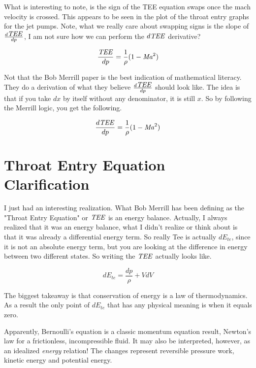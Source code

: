 \documentclass{article}
\newcommand\Mach{\mbox{\textit{Ma}}}  %
\newcommand\Tee{\mbox{\textit{TEE}}}  %
\begin{document}
What is interesting to note, is the sign of the TEE equation swaps once the mach velocity is crossed. This appears to be seen in the plot of the throat entry graphs for the jet pumps. Note, what we really care about swapping signs is the slope of $\frac{d\Tee}{dp}$, I am not sure how we can perform the $d\Tee$ derivative?

\begin{equation}
\frac{\Tee}{dp} = \frac{1}{\rho}(1 - \Mach^2)
\end{equation}

Not that the Bob Merrill paper \cite{merrill} is the best indication of mathematical literacy. They do a derivation of what they believe $\frac{d\Tee}{dp}$ should look like. The idea is that if you take $dx$ by itself without any denominator, it is still $x$. So by following the Merrill logic, you get the following.

\begin{equation}
    \frac{d\Tee}{dp} = \frac{1}{\rho}(1 - \Mach^2)
\end{equation}

\section{Throat Entry Equation Clarification}

I just had an interesting realization. What Bob Merrill has been defining as the "Throat Entry Equation" or $\Tee$ is an energy balance. Actually, I always realized that it was an energy balance, what I didn't realize or think about is that it was already a differential energy term. So really Tee is actually $dE_{te}$, since it is not an absolute energy term, but you are looking at the difference in energy between two different states. So writing the $\Tee$ actually looks like.

\begin{equation}
    dE_{te} = \frac{dp}{\rho} + VdV
\end{equation}

The biggest takeaway is that conservation of energy is a law of thermodynamics. As a result the only point of $dE_{te}$ that has any physical meaning is when it equals zero.

Apparently, Bernoulli's equation is a classic momentum equation result, Newton's law for a frictionless, incompressible fluid. It may also be interpreted, however, as an idealized \emph{energy} relation! The changes represent reversible pressure work, kinetic energy and potential energy.
\end{document}
